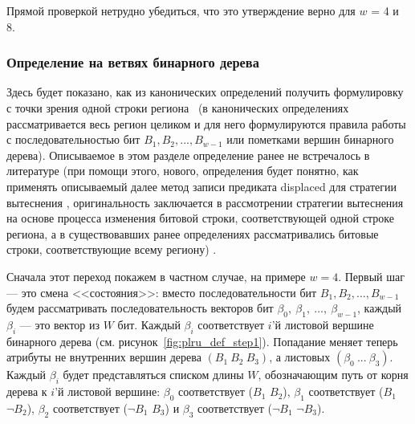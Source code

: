 Прямой проверкой нетрудно убедиться, что это утверждение верно для $w$ = 4 и 8.

\subsubsection{Определение \PseudoLRU на ветвях бинарного дерева}\label{sec:PseudoLRUonBranches}

Здесь будет показано, как из канонических определений \PseudoLRU получить формулировку \PseudoLRU с точки зрения одной строки региона~\cite{my_lomonosov_2010} (в канонических определениях рассматривается весь регион целиком и для него формулируются правила работы с последовательностью бит $B_1, B_2, ..., B_{w{-}1}$ или пометками вершин бинарного дерева). Описываемое в этом разделе определение \PseudoLRU ранее не встречалось в литературе (при помощи этого, нового, определения будет понятно, как применять описываемый далее метод записи предиката displaced для стратегии вытеснения \PseudoLRU, оригинальность заключается в рассмотрении стратегии вытеснения \PseudoLRU на основе процесса изменения битовой строки, соответствующей одной строке региона, а в существовавших ранее определениях рассматривались битовые строки, соответствующие всему региону) .

Сначала этот переход покажем в частном случае, на примере $w=4$. Первый шаг --- это
смена <<состояния>>: вместо последовательности бит $B_1, B_2, ...,
B_{w-1}$ будем рассматривать последовательность векторов бит
$\beta_0,~\beta_1,~\dots,~\beta_{w-1}$, каждый $\beta_i$ --- это вектор из $W$ бит. Каждый $\beta_i$ соответствует $i$'й листовой вершине бинарного дерева (см. рисунок~\ref{fig:plru_def_step1}). Попадание
меняет теперь атрибуты не внутренних вершин дерева $(B_1~B_2~B_3)$, а листовых $(\beta_0~...~\beta_3)$.
Каждый $\beta_i$ будет представляться списком длины $W$, обозначающим путь от
корня дерева к $i$'й листовой вершине: $\beta_0$ соответствует
($B_1$ $B_2$), $\beta_1$ соответствует ($B_1$ $\neg B_2$), $\beta_2$
соответствует ($\neg B_1$ $B_3$) и $\beta_3$ соответствует ($\neg
B_1$ $ \neg B_3$).\\[0.5cm]

